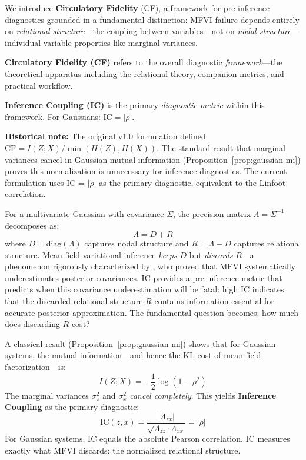 \documentclass[10pt]{article} %
\theoremstyle{plain}
\theoremstyle{definition}
\newcommand{\IC}{\mathrm{IC}}  %
\begin{document}
We introduce \textbf{Circulatory Fidelity} (CF), a framework for pre-inference diagnostics grounded in a fundamental distinction: MFVI failure depends entirely on \emph{relational structure}---the coupling between variables---not on \emph{nodal structure}---individual variable properties like marginal variances.

\begin{tcolorbox}[colback=blue!5, colframe=blue!50!black, title=\textbf{Notation: CF Framework vs.\ IC Diagnostic}]
\textbf{Circulatory Fidelity (CF)} refers to the overall diagnostic \emph{framework}---the theoretical apparatus including the relational theory, companion metrics, and practical workflow.

\textbf{Inference Coupling (IC)} is the primary \emph{diagnostic metric} within this framework. For Gaussians: $\IC = |\rho|$.

\textbf{Historical note:} The original v1.0 formulation defined $\text{CF} = I(Z;X)/\min(H(Z), H(X))$. The standard result that marginal variances cancel in Gaussian mutual information (Proposition~\ref{prop:gaussian-mi}) proves this normalization is unnecessary for inference diagnostics. The current formulation uses IC = $|\rho|$ as the primary diagnostic, equivalent to the Linfoot correlation.
\end{tcolorbox}

For a multivariate Gaussian with covariance $\Sigma$, the precision matrix $\Lambda = \Sigma^{-1}$ decomposes as:
\begin{equation}
\Lambda = D + R
\label{eq:decomposition}
\end{equation}
where $D = \text{diag}(\Lambda)$ captures nodal structure and $R = \Lambda - D$ captures relational structure. Mean-field variational inference \emph{keeps} $D$ but \emph{discards} $R$---a phenomenon rigorously characterized by \citet{giordano2018covariances}, who proved that MFVI systematically underestimates posterior covariances. IC provides a pre-inference metric that predicts when this covariance underestimation will be fatal: high IC indicates that the discarded relational structure $R$ contains information essential for accurate posterior approximation. The fundamental question becomes: how much does discarding $R$ cost?

A classical result (Proposition~\ref{prop:gaussian-mi}) shows that for Gaussian systems, the mutual information---and hence the KL cost of mean-field factorization---is:
\begin{equation}
I(Z; X) = -\frac{1}{2}\log(1 - \rho^2)
\end{equation}
The marginal variances $\sigma_z^2$ and $\sigma_x^2$ \emph{cancel completely}. This yields \textbf{Inference Coupling} as the primary diagnostic:
\begin{equation}
\IC(z, x) = \frac{|\Lambda_{zx}|}{\sqrt{\Lambda_{zz} \cdot \Lambda_{xx}}} = |\rho|
\label{eq:ic}
\end{equation}
For Gaussian systems, IC equals the absolute Pearson correlation. IC measures exactly what MFVI discards: the normalized relational structure.
\end{document}
